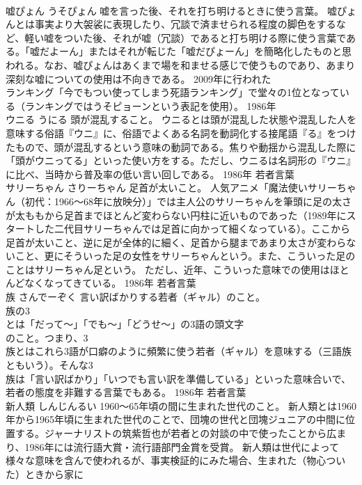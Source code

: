 \documentclass[8pt]{extreport}
\begin{document}
\begin{CJK}{UTF8}{min}
\\	嘘ぴょん	うそぴょん	嘘を言った後、それを打ち明けるときに使う言葉。	嘘ぴょんとは事実より大袈裟に表現したり、冗談で済ませられる程度の脚色をするなど、軽い嘘をついた後、それが嘘（冗談）であると打ち明ける際に使う言葉である。「嘘だよーん」またはそれが転じた「嘘だぴょーん」を簡略化したものと思われる。なお、嘘ぴょんはあくまで場を和ませる感じで使うものであり、あまり深刻な嘘についての使用は不向きである。 2009年に行われた
\\	ランキング「今でもつい使ってしまう死語ランキング」で堂々の1位となっている（ランキングではうそピョーンという表記を使用）。	1986年	
\\	ウニる	うにる	頭が混乱すること。	ウニるとは頭が混乱した状態や混乱した人を意味する俗語『ウニ』に、俗語でよくある名詞を動詞化する接尾語『る』をつけたもので、頭が混乱するという意味の動詞である。焦りや動揺から混乱した際に「頭がウニってる」といった使い方をする。ただし、ウニるは名詞形の『ウニ』に比べ、当時から普及率の低い言い回しである。	1986年	若者言葉	
\\	サリーちゃん	さりーちゃん	足首が太いこと。	人気アニメ「魔法使いサリーちゃん（初代：1966～68年に放映分）」では主人公のサリーちゃんを筆頭に足の太さが太ももから足首までほとんど変わらない円柱に近いものであった（1989年にスタートした二代目サリーちゃんでは足首に向かって細くなっている）。ここから足首が太いこと、逆に足が全体的に細く、足首から腿まであまり太さが変わらないこと、更にそういった足の女性をサリーちゃんという。また、こういった足のことはサリーちゃん足という。 ただし、近年、こういった意味での使用はほとんどなくなってきている。	1986年	若者言葉	
\\	族	さんでーぞく	言い訳ばかりする若者（ギャル）のこと。	
\\	族の3
\\	とは「だって～」「でも～」「どうせ～」の3語の頭文字
\\	のこと。つまり、3
\\	族とはこれら3語が口癖のように頻繁に使う若者（ギャル）を意味する（三語族ともいう）。そんな3
\\	族は「言い訳ばかり」「いつでも言い訳を準備している」といった意味合いで、若者の態度を非難する言葉でもある。	1986年	若者言葉	
\\	新人類	しんじんるい	1960～65年頃の間に生まれた世代のこと。	新人類とは1960年から1965年頃に生まれた世代のことで、団塊の世代と団塊ジュニアの中間に位置する。ジャーナリストの筑紫哲也が若者との対談の中で使ったことから広まり、1986年には流行語大賞・流行語部門金賞を受賞。 新人類は世代によって様々な意味を含んで使われるが、事実検証的にみた場合、生まれた（物心ついた）ときから家に

\end{CJK}
\end{document}
